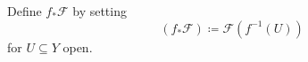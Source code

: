 Define $f_*\mathcal{F}$ by setting
\[ (f_*\mathcal{F})\coloneqq \mathcal{F}(f^{-1}(U)) \]
for $U \subseteq Y$ open.
